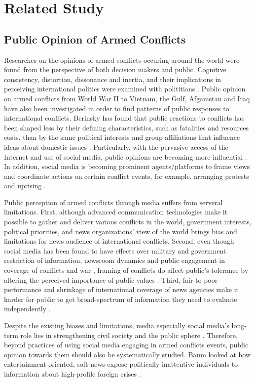 \section{Related Study}
\subsection{Public Opinion of Armed Conflicts}
Researches on the opinions of armed conflicts occuring around the world were found from the perspective of both decision makers and public. Cognitive consistency, distortion, dissonance and inertia, and their implications in perceiving international politics were examined with polititians \cite{Jervis1976}. Public opinion on armed conflicts from World War II to Vietnam, the Gulf, Afganistan and Iraq have also been investigated in order to find patterns of public responses to international conflicts. Berinsky has found that public reactions to conflicts has been shaped less by their defining characteristics, such as fatalities and resources costs, than by the same political interests and group affiliations that influence ideas about domestic issues \cite{Berinsky2009}. Particularly, with the pervasive access of the Internet and use of social media, public opinions are becoming more influential \cite{Shirky2011}. In addition, social media is becoming prominent agents/platforms to frame views and coordinate actions on certain conflict events, for example, arranging protests and uprising \cite{Lim2012}. 

Public perception of armed conflicts through media suffers from serveral limitations. First, although advanced communication technologies make it possible to gather and deliver various conflicts in the world, government interests, political priorities, and news organizations' view of the world brings bias and limitations for news audience of international conflicts. Second, even though social media has been found to have effects over military and government restriction of information, newsroom dynamics and public engagement in coverage of conflicts and war \cite{Sacco2015},  framing of conflicts do affect public's tolerance by altering the perceived importance of public values \cite{Nelson1997}. Third, fair to poor performance and shrinkage of international coverage of news agencies make it harder for public to get broad-spectrum of information they need to evaluate independently \cite{Seib2004}.

Despite the existing biases and limitations, media especially social media's long-term role lies in strengthening civil society and the public sphere \cite{Shirky2011}. Therefore, beyond practices of using social media engaging in armed conflicts events, public opinion towards them should also be systematically studied. Baum looked at how entertainment-oriented, soft news expose politically inattentive individuals to information about high-profile foreign crises \cite{Baum2002}.

